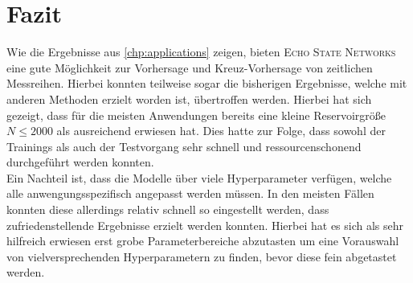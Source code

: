 \chapter{Fazit}
Wie die Ergebnisse aus \ref{chp:applications} zeigen, bieten \textsc{Echo State Networks} eine gute Möglichkeit zur Vorhersage und Kreuz-Vorhersage von zeitlichen Messreihen. Hierbei konnten teilweise sogar die bisherigen Ergebnisse, welche mit anderen Methoden erzielt worden ist, übertroffen werden. Hierbei hat sich gezeigt, dass für die meisten Anwendungen bereits eine kleine Reservoirgröße $N \leq 2000$ als ausreichend erwiesen hat. Dies hatte zur Folge, dass sowohl der Trainings als auch der Testvorgang sehr schnell und ressourcenschonend durchgeführt werden konnten.\\

Ein Nachteil ist, dass die Modelle über viele Hyperparameter verfügen, welche alle anwengungsspezifisch angepasst werden müssen. In den meisten Fällen konnten diese allerdings relativ schnell so eingestellt werden, dass zufriedenstellende Ergebnisse erzielt werden konnten. Hierbei hat es sich als sehr hilfreich erwiesen erst grobe Parameterbereiche abzutasten um eine Vorauswahl von vielversprechenden Hyperparametern zu finden, bevor diese fein abgetastet werden. 